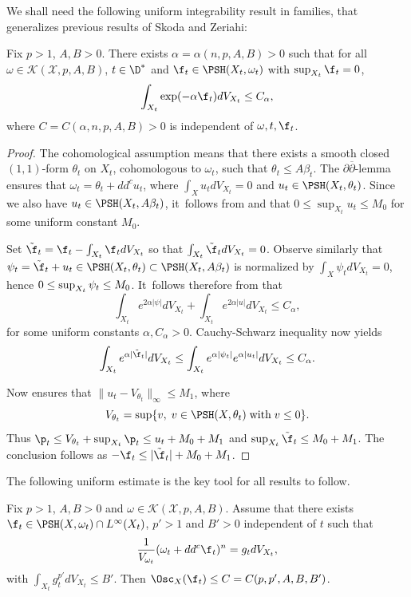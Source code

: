 We shall need the following uniform integrability result in families, that
generalizes previous results of Skoda and Zeriahi:

\begin{theorem} \label{thm:sz}
Fix $p>1$, $A,B>0$. There exists $\alpha=\alpha(n,p,A,B)>0$ such that for all
$\omega \in {\mathcal K}(\mathcal{X},p,A,B)$, $t \in \D^*$ and
$\f_t \in \PSH(X_t,\omega_t)$ with $\sup_{X_t} \f_t=0$,
\[
\int_{X_t} \exp(-\alpha \f_t) dV_{X_t} \leq C_{\alpha},
\]
where $C=C(\alpha,n,p,A,B)>0$ is independent of $\omega,t,\f_t$.
\end{theorem}

\begin{proof}
The cohomological assumption means that there exists a smooth closed $(1,1)$-form $\theta_t$ on $X_t$,
cohomologous to $\omega_t$, such that $\theta_t \leq A\beta_t$.
The $\partial\overline{\partial}$-lemma ensures that $\omega_t=\theta_t+dd^c u_t$, where
$\int _X u_t dV_{X_t} =0$ and $u_t \in \PSH(X_t,\theta_t)$.
Since we also have $u_t \in \PSH(X_t, A \beta_t)$, it~follows from \cite[Conj.\,3.1]{DnGG23} and \cite[Cor.\,4.8]{Ou22}
that $0 \leq \sup_{X_t} u_t \leq M_0$ for some uniform constant $M_0$.

Set $\tilde{\f}_t=\f_t-\int_{X_t} \f_t dV_{X_t}$ so that $\int_{X_t} \tilde{\f}_t dV_{X_t}=0$.
Observe similarly that $ \psi_t=\tilde{\f}_t+u_t \in \PSH(X_t, \theta_t) \subset\PSH(X_t, A \beta_t)$
is normalized by $\int_{X} \psi_t dV_{X_t}=0$,
hence $0 \leq\nobreak \sup_{X_t} \psi_t \leq M_0$. It~follows therefore from \cite[Th.\,2.9]{DnGG23} that
\[
\int_{X_t} e^{2\alpha|\psi|}dV_{X_t} + \int_{X_t} e^{2\alpha| u |}dV_{X_t} \leq C_\alpha,
\]
for some uniform constants $\alpha,C_\alpha>0$.
Cauchy-Schwarz inequality now yields
\[
\int_{X_t} e^{\alpha |\tilde{\f}_t| } dV_{X_t}
\leq \int_{X_t} e^{\alpha |\psi_t| } e^{\alpha |u_t| } dV_{X_t}
\leq C_\alpha.
\]

Now \cite[Th.\,1.9]{DnGG23} ensures that $\|u_t-V_{\theta_t}\|_{\infty} \leq M_1$,
where
\[
V_{\theta_t}=\sup \{v, \; v \in\PSH(X,\theta_t) \; \text{with} \; v \leq 0 \}.
\]
Thus $\p_t \leq V_{\theta_t}+\sup_{X_t} \p_t \leq u_t+M_0+M_1$ and $\sup_{X_t} \tilde{\f}_t \leq M_0+M_1$.
The conclusion follows as $-\f_t \leq |\tilde{\f}_t|+M_0+M_1$.
\end{proof}

The following uniform estimate is the key tool for all results to follow.

\begin{theorem} \label{thm:uniformMA}
Fix $p>1$, $A,B>0$ and $\omega \in {\mathcal K}(\mathcal{X},p,A,B)$.
Assume that there exists $\f_t \in\PSH(X,\omega_t) \cap L^{\infty}(X_t)$,
$p'>1$ and $B'>0$ independent of $t$ such that
\[
\frac{1}{V_{\omega_t}}(\omega_t+dd^c \f_t)^n=g_t dV_{X_t},
\]
with $\int_{X_t} g_t^{p'} dV_{X_t} \leq B'$.
Then $\Osc_X(\f_t) \leq C=C(p,p',A,B,B')$.
\end{theorem}

